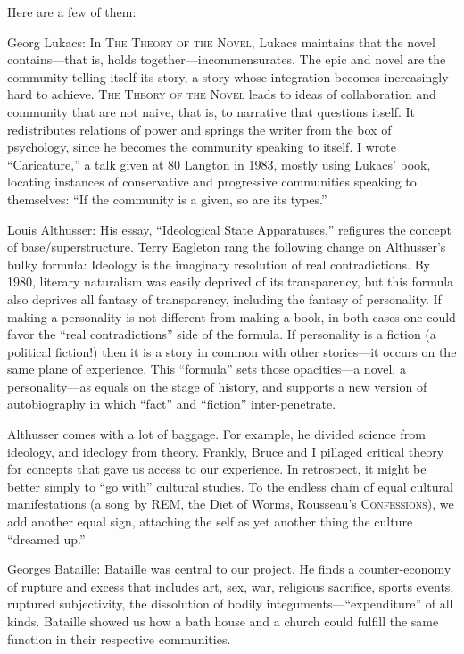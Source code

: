 \documentclass[
]{memoir}
\begin{document}
Here are a few of them:

Georg Lukacs: In \textsc{The Theory of the Novel}, Lukacs maintains that
the novel contains---that is, holds together---incommensurates. The epic
and novel are the community telling itself its story, a story whose
integration becomes increasingly hard to achieve. \textsc{The Theory of
the Novel} leads to ideas of collaboration and community that are not
naive, that is, to narrative that questions itself. It redistributes
relations of power and springs the writer from the box of psychology,
since he becomes the community speaking to itself. I wrote
``Caricature,'' a talk given at 80 Langton in 1983, mostly using Lukacs'
book, locating instances of conservative and progressive communities
speaking to themselves: ``If the community is a given, so are its
types.''

Louis Althusser: His essay, ``Ideological State Apparatuses,'' refigures
the concept of base/superstructure. Terry Eagleton rang the following
change on Althusser's bulky formula: Ideology is the imaginary
resolution of real contradictions. By 1980, literary naturalism was
easily deprived of its transparency, but this formula also deprives all
fantasy of transparency, including the fantasy of personality. If making
a personality is not different from making a book, in both cases one
could favor the ``real contradictions'' side of the formula. If
personality is a fiction (a political fiction!) then it is a story in
common with other stories---it occurs on the same plane of experience.
This ``formula'' sets those opacities---a novel, a personality---as
equals on the stage of history, and supports a new version of
autobiography in which ``fact'' and ``fiction'' inter-penetrate.

Althusser comes with a lot of baggage. For example, he divided science
from ideology, and ideology from theory. Frankly, Bruce and I pillaged
critical theory for concepts that gave us access to our experience. In
retrospect, it might be better simply to ``go with'' cultural studies.
To the endless chain of equal cultural manifestations (a song by REM,
the Diet of Worms, Rousseau's \textsc{Confessions}), we add another
equal sign, attaching the self as yet another thing the culture
``dreamed up.''

Georges Bataille: Bataille was central to our project. He finds a
counter-economy of rupture and excess that includes art, sex, war,
religious sacrifice, sports events, ruptured subjectivity, the
dissolution of bodily integuments---``expenditure'' of all kinds.
Bataille showed us how a bath house and a church could fulfill the same
function in their respective communities.
\end{document}
